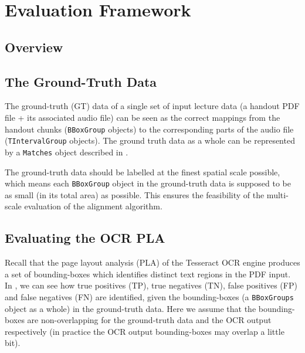 
\chapter{Evaluation Framework}

\ifpdf
    \graphicspath{{Chapter7/Figs/Raster/}{Chapter7/Figs/PDF/}{Chapter7/Figs/}}
\else
    \graphicspath{{Chapter7/Figs/Vector/}{Chapter7/Figs/}}
\fi


\section{Overview}

\section{The Ground-Truth Data}

The ground-truth (GT) data of a single set of input lecture data (a handout PDF file + its associated audio file) can be seen as the correct mappings from the handout chunks (\texttt{BBoxGroup} objects) to the corresponding parts of the audio file (\texttt{TIntervalGroup} objects). The ground truth data as a whole can be represented by a \texttt{Matches} object described in .

The ground-truth data should be labelled at the finest spatial scale possible, which means each \texttt{BBoxGroup} object in the ground-truth data is supposed to be as small (in its total area) as possible. This ensures the feasibility of the multi-scale evaluation of the alignment algorithm.

\section{Evaluating the OCR PLA}

Recall that the page layout analysis (PLA) of the Tesseract OCR engine produces a set of bounding-boxes which identifies distinct text regions in the PDF input. In , we can see how true positives (TP), true negatives (TN), false positives (FP) and false negatives (FN) are identified, given the bounding-boxes (a \texttt{BBoxGroups} object as a whole) in the ground-truth data. Here we assume that the bounding-boxes are non-overlapping for the ground-truth data and the OCR output respectively (in practice the OCR output bounding-boxes may overlap a little bit).

